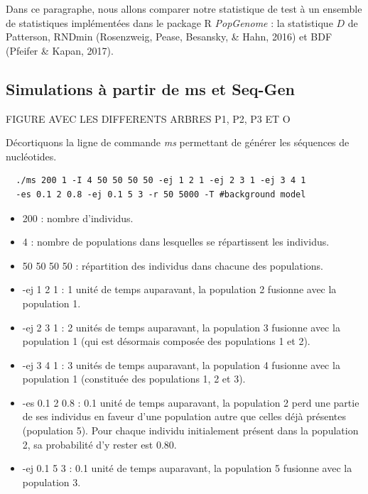 \documentclass[12pt,twoside]{reedthesis}
\theoremstyle{definition}
\theoremstyle{definition}
\theoremstyle{remark}
\begin{document}
  Dans ce paragraphe, nous allons comparer notre statistique de test à un
  ensemble de statistiques implémentées dans le package R \emph{PopGenome}
  : la statistique \(D\) de Patterson, RNDmin (Rosenzweig, Pease,
  Besansky, \& Hahn, 2016) et BDF (Pfeifer \& Kapan, 2017).
  
  \subsection{Simulations à partir de ms et
  Seq-Gen}\label{simulations-a-partir-de-ms-et-seq-gen}
  
  FIGURE AVEC LES DIFFERENTS ARBRES P1, P2, P3 ET O
  
  Décortiquons la ligne de commande \emph{ms} permettant de générer les
  séquences de nucléotides.
  
  \begin{verbatim}
  ./ms 200 1 -I 4 50 50 50 50 -ej 1 2 1 -ej 2 3 1 -ej 3 4 1 
  -es 0.1 2 0.8 -ej 0.1 5 3 -r 50 5000 -T #background model
  \end{verbatim}
  
  \begin{itemize}
  \item
    200 : nombre d'individus.
  \item
    4 : nombre de populations dans lesquelles se répartissent les
    individus.
  \item
    50 50 50 50 : répartition des individus dans chacune des populations.
  \item
    -ej 1 2 1 : 1 unité de temps auparavant, la population 2 fusionne avec
    la population 1.
  \item
    -ej 2 3 1 : 2 unités de temps auparavant, la population 3 fusionne
    avec la population 1 (qui est désormais composée des populations 1 et
    2).
  \item
    -ej 3 4 1 : 3 unités de temps auparavant, la population 4 fusionne
    avec la population 1 (constituée des populations 1, 2 et 3).
  \item
    -es 0.1 2 0.8 : 0.1 unité de temps auparavant, la population 2 perd
    une partie de ses individus en faveur d'une population autre que
    celles déjà présentes (population 5). Pour chaque individu
    initialement présent dans la population 2, sa probabilité d'y rester
    est 0.80.
  \item
    -ej 0.1 5 3 : 0.1 unité de temps auparavant, la population 5 fusionne
    avec la population 3.
  \end{itemize}
  
\end{document}

